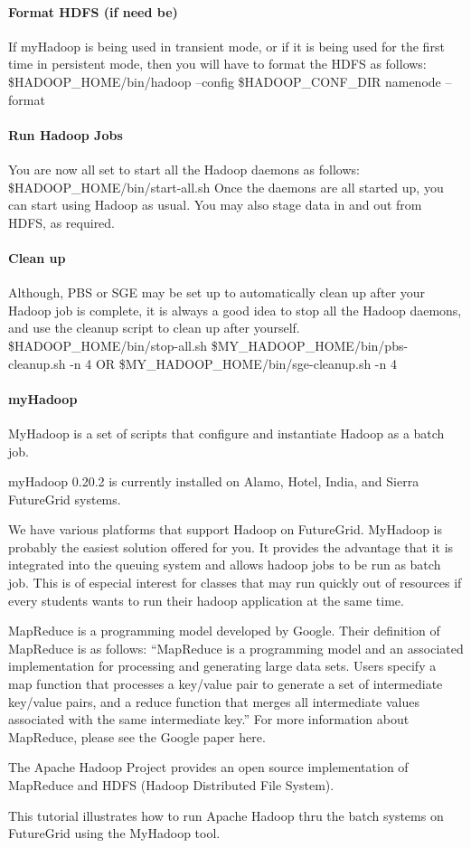 \paragraph{Format HDFS (if need be)}

If myHadoop is being used in transient mode, or if it is being used for the first time in
persistent mode, then you will have to format the HDFS as follows:
\$HADOOP\_HOME/bin/hadoop --config \$HADOOP\_CONF\_DIR namenode –format

\paragraph{Run Hadoop Jobs}

You are now all set to start all the Hadoop daemons as follows:
\$HADOOP\_HOME/bin/start-all.sh
Once the daemons are all started up, you can start using Hadoop as usual. You may also
stage data in and out from HDFS, as required.

\paragraph{Clean up}

Although, PBS or SGE may be set up to automatically clean up after your Hadoop job is
complete, it is always a good idea to stop all the Hadoop daemons, and use the cleanup
script to clean up after yourself.
\$HADOOP\_HOME/bin/stop-all.sh
\$MY\_HADOOP\_HOME/bin/pbs-cleanup.sh -n 4 OR
\$MY\_HADOOP\_HOME/bin/sge-cleanup.sh -n 4


\paragraph{myHadoop}

MyHadoop is a set of scripts that configure and instantiate Hadoop as a batch job.

myHadoop 0.20.2 is currently installed on Alamo, Hotel, India, and Sierra FutureGrid systems.



We have various platforms that support Hadoop on FutureGrid. MyHadoop is probably the easiest solution offered for you. It provides the advantage that it is integrated into the queuing system and allows hadoop jobs to be run as batch job. This is of especial interest for classes that may run quickly out of resources if every students wants to run their hadoop application at the same time.



MapReduce is a programming model developed by Google. Their definition of MapReduce is as follows: “MapReduce is a programming model and an associated implementation for processing and generating large data sets. Users specify a map function that processes a key/value pair to generate a set of intermediate key/value pairs, and a reduce function that merges all intermediate values associated with the same intermediate key.” For more information about MapReduce, please see the Google paper here.

The Apache Hadoop Project provides an open source implementation of MapReduce and HDFS (Hadoop Distributed File System).

This tutorial illustrates how to run Apache Hadoop thru the batch systems on FutureGrid using the MyHadoop tool.



